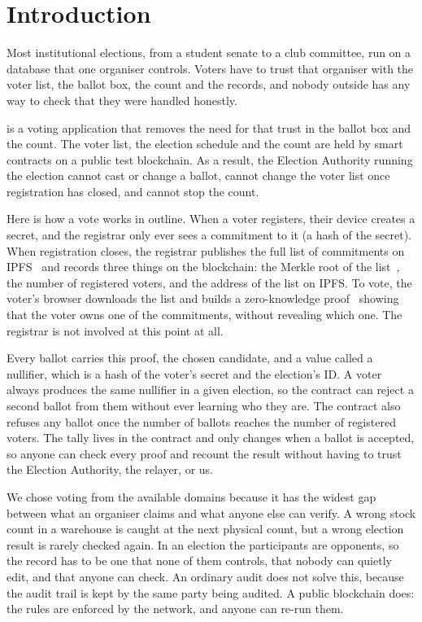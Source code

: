 \section{Introduction}

Most institutional elections, from a student senate to a club committee, run on
a database that one organiser controls. Voters have to trust that organiser
with the voter list, the ballot box, the count and the records, and nobody
outside has any way to check that they were handled honestly.

\projectname{} is a voting application that removes the need for that trust in
the ballot box and the count. The voter list, the election schedule and the
count are held by smart contracts on a public test blockchain. As a result, the
Election Authority running the election cannot cast or change a ballot, cannot
change the voter list once registration has closed, and cannot stop the count.

Here is how a vote works in outline. When a voter registers, their device
creates a secret, and the registrar only ever sees a commitment to it (a hash
of the secret). When registration closes, the registrar publishes the full list
of commitments on IPFS~\cite{ipfs} and records three things on the blockchain:
the Merkle root of the list~\cite{merkle}, the number of registered voters, and
the address of the list on IPFS. To vote, the voter's browser downloads the
list and builds a zero-knowledge proof~\cite{semaphore} showing that the voter
owns one of the commitments, without revealing which one. The registrar is not
involved at this point at all.

Every ballot carries this proof, the chosen candidate, and a value called a
nullifier, which is a hash of the voter's secret and the election's ID. A voter
always produces the same nullifier in a given election, so the contract can
reject a second ballot from them without ever learning who they are. The
contract also refuses any ballot once the number of ballots reaches the number
of registered voters. The tally lives in the contract and only changes when a
ballot is accepted, so anyone can check every proof and recount the result
without having to trust the Election Authority, the relayer, or us.

We chose voting from the available domains because it has the widest gap
between what an organiser claims and what anyone else can verify. A wrong stock
count in a warehouse is caught at the next physical count, but a wrong election
result is rarely checked again. In an election the participants are
opponents, so the record has to be one that none of them controls, that nobody
can quietly edit, and that anyone can check. An ordinary audit does not solve
this, because the audit trail is kept by the same party being audited. A public
blockchain does: the rules are enforced by the network, and anyone can re-run
them.

